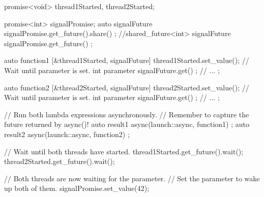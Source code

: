 \begin{cpp}
promise<void> thread1Started, thread2Started;

promise<int> signalPromise;
auto signalFuture { signalPromise.get_future().share() };
//shared_future<int> signalFuture { signalPromise.get_future() };

auto function1 { [&thread1Started, signalFuture] {
        thread1Started.set_value();
        // Wait until parameter is set.
        int parameter { signalFuture.get() };
        // ...
} };

auto function2 { [&thread2Started, signalFuture] {
        thread2Started.set_value();
        // Wait until parameter is set.
        int parameter { signalFuture.get() };
        // ...
} };

// Run both lambda expressions asynchronously.
// Remember to capture the future returned by async()!
auto result1 { async(launch::async, function1) };
auto result2 { async(launch::async, function2) };

// Wait until both threads have started.
thread1Started.get_future().wait();
thread2Started.get_future().wait();

// Both threads are now waiting for the parameter.
// Set the parameter to wake up both of them.
signalPromise.set_value(42);
\end{cpp}












